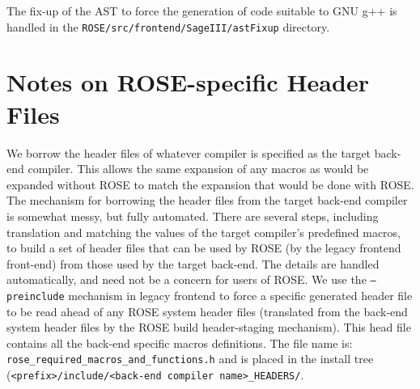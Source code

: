            The fix-up of the AST to force the generation of code suitable to GNU g++ is
           handled in the {\tt ROSE/src/frontend/SageIII/astFixup} directory.



\section{Notes on ROSE-specific Header Files }

    We borrow the header files of whatever compiler is specified as the target back-end
    compiler.  This allows the same expansion of any macros as would be expanded without
    ROSE to match the expansion that would be done with ROSE.  The mechanism for borrowing
    the header files from the target back-end compiler is somewhat messy, but fully
    automated.  There are several steps, including translation and matching the values of
    the target compiler's predefined macros, to build a set of header files that can be
    used by ROSE (by the legacy frontend front-end) from those used by the target back-end.
    The details are handled automatically, and need not be a concern for users of ROSE.
    We use the {\tt --preinclude} mechanism in legacy frontend to force a specific generated header file 
    to be read ahead of any ROSE system header files (translated from the back-end system
    header files by the ROSE build header-staging mechanism).  This head file contains
    all the back-end specific macros definitions. The file name is:
    {\tt rose\_required\_macros\_and\_functions.h} and is placed in the install
    tree ({\tt <prefix>/include/<back-end compiler name>\_HEADERS/}.

